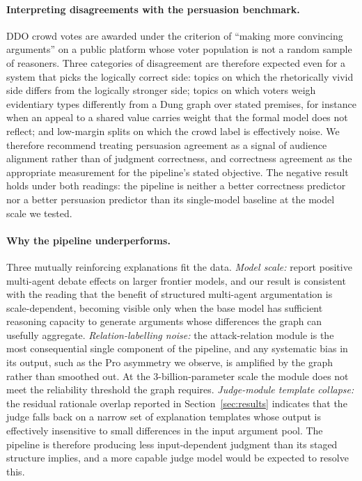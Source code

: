 \documentclass[11pt,twocolumn,letterpaper]{article}
\begin{document}
\paragraph{Interpreting disagreements with the persuasion benchmark.}
DDO crowd votes are awarded under the criterion of ``making more
convincing arguments'' on a public platform whose voter population
is not a random sample of reasoners. Three categories of
disagreement are therefore expected even for a system that picks
the logically correct side: topics on which the rhetorically vivid
side differs from the logically stronger side; topics on which
voters weigh evidentiary types differently from a Dung graph over
stated premises, for instance when an appeal to a shared value
carries weight that the formal model does not reflect; and
low-margin splits on which the crowd label is effectively noise.
We therefore recommend treating persuasion agreement as a signal
of audience alignment rather than of judgment correctness, and
correctness agreement as the appropriate measurement for the
pipeline's stated objective. The negative result holds under both
readings: the pipeline is neither a better correctness predictor
nor a better persuasion predictor than its single-model baseline
at the model scale we tested.

\paragraph{Why the pipeline underperforms.}
Three mutually reinforcing explanations fit the data.
\textit{Model scale:} \citet{du2023multiagent} report positive
multi-agent debate effects on larger frontier models, and our
result is consistent with the reading that the benefit of
structured multi-agent argumentation is scale-dependent, becoming
visible only when the base model has sufficient reasoning
capacity to generate arguments whose differences the graph can
usefully aggregate. \textit{Relation-labelling noise:} the
attack-relation module is the most consequential single component
of the pipeline, and any systematic bias in its output, such as
the Pro asymmetry we observe, is amplified by the graph rather
than smoothed out. At the 3-billion-parameter scale the module
does not meet the reliability threshold the graph requires.
\textit{Judge-module template collapse:} the residual rationale
overlap reported in Section~\ref{sec:results} indicates that the
judge falls back on a narrow set of explanation templates whose
output is effectively insensitive to small differences in the
input argument pool. The pipeline is therefore producing less
input-dependent judgment than its staged structure implies, and
a more capable judge model would be expected to resolve this.
\end{document}
